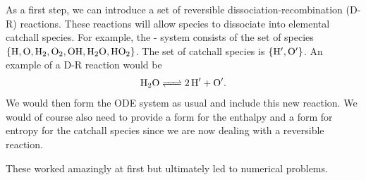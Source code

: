 As a first step, we can introduce a set of reversible dissociation-recombination 
(D-R) reactions.  These reactions will allow species to dissociate into elemental 
catchall species.  For example, the - system consists of the set 
of species $\left\{\ce{H}, \ce{O}, \ce{H2}, \ce{O2}, \ce{OH}, \ce{H2O}, \ce{HO2}\right\}$. 
The set of catchall species is $\left\{\ce{H}^{\prime}, \ce{O}^{\prime}\right\}$. 
An example of a D-R reaction would be 
\begin{align}
  \ce{H2O <=> 2H^{\prime} + O^{\prime}}.
\end{align} 
We would then form the ODE system as usual and include this new reaction.  We 
would of course also need to provide a form for the enthalpy and a form for 
entropy for the catchall species since we are now dealing with a reversible 
reaction.  

These worked amazingly at first but ultimately led to numerical problems.

